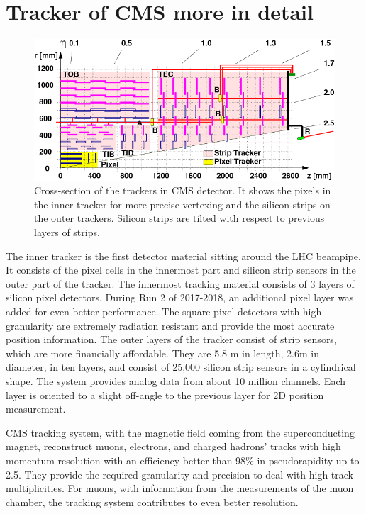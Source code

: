 \section{Tracker of CMS more in detail}
\begin{figure}[h!]
	\caption{Cross-section of the trackers in CMS detector. It shows the pixels in the inner tracker for more precise vertexing and the silicon strips on the outer trackers. Silicon strips are tilted with respect to previous layers of strips. \cite{trk}}
  \label{fig:tracker}
  \centering
  \includegraphics[width=0.9\linewidth]{figs/Tracker.png}
\end{figure}

The inner tracker is the first detector material sitting around the LHC beampipe.
It consists of the pixel cells in the innermost part and silicon strip sensors in the outer part of the tracker.
The innermost tracking material consists of 3 layers of silicon pixel detectors.
During Run 2 of 2017-2018, an additional pixel layer was added for even better performance.
The square pixel detectors with high granularity are extremely radiation resistant and provide the most accurate position information.
The outer layers of the tracker consist of strip sensors, which are more financially affordable.
They are 5.8 m in length, 2.6m in diameter, in ten layers, and consist of 25,000 silicon strip sensors in a cylindrical shape.
The system provides analog data from about 10 million channels.
Each layer is oriented to a slight off-angle to the previous layer for 2D position measurement.

CMS tracking system, with the magnetic field coming from the superconducting magnet, reconstruct muons, electrons, and charged hadrons' tracks with high momentum resolution with an efficiency better than 98\% in pseudorapidity up to 2.5.
They provide the required granularity and precision to deal with high-track multiplicities.
For muons, with information from the measurements of the muon chamber, the tracking system contributes to even better resolution.

